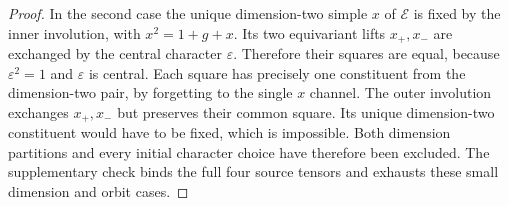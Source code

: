 \begin{proof}
In the second case the unique dimension-two simple $x$ of
$\mathcal E$ is fixed by the inner involution, with
$x^2=1+g+x$. Its two equivariant lifts $x_+,x_-$ are exchanged by the
central character $\varepsilon$. Therefore their squares are equal,
because $\varepsilon^2=1$ and $\varepsilon$ is central.
Each square has precisely one constituent from the dimension-two pair,
by forgetting to the single $x$ channel. The outer involution exchanges
$x_+,x_-$ but preserves their common square. Its unique dimension-two
constituent would have to be fixed, which is impossible.
Both dimension partitions and every initial character choice have
therefore been excluded. The supplementary check binds the full four
source tensors and exhausts these small dimension and orbit cases.
\end{proof}
